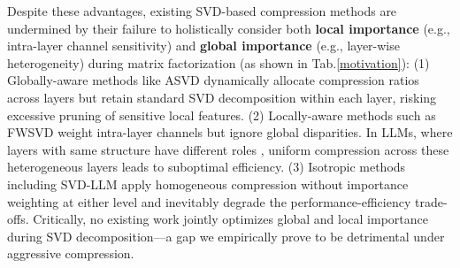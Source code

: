 \documentclass[11pt]{article}
\begin{document}
\begin{table}[t]
\centering
\fontsize{60pt}{20pt}\selectfont 
\renewcommand{\arraystretch}{5.0}
\caption{Comparison of existing SVD-based methods.}
\label{motivation}
\end{table}


Despite these advantages, existing SVD-based compression methods are undermined by their failure to holistically consider both \textbf{local importance} (e.g., intra-layer channel sensitivity) and \textbf{global importance} (e.g., layer-wise heterogeneity) during matrix factorization (as shown in Tab.\ref{motivation}):  (1) Globally-aware methods like ASVD \citep{yuan2023asvd} dynamically allocate compression ratios across layers but retain standard SVD decomposition within each layer, risking excessive pruning of sensitive local features. (2) Locally-aware methods such as FWSVD \citep{hsu2022language} weight intra-layer channels but ignore global disparities. In LLMs, where layers with same structure have different roles \citep{zhang2024investigating}, uniform compression across these heterogeneous layers leads to suboptimal efficiency. (3) Isotropic methods including SVD-LLM \citep{wang2024svd} apply homogeneous compression without importance weighting at either level and inevitably degrade the performance-efficiency trade-offs. Critically, no existing work jointly optimizes global and local importance during SVD decomposition—a gap we empirically prove to be detrimental under aggressive compression. 
\end{document}
